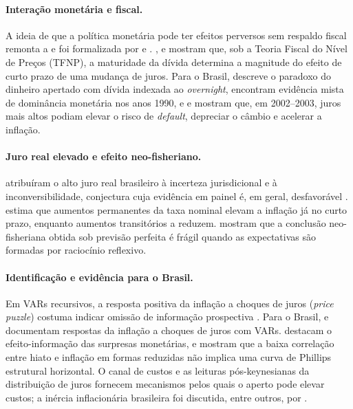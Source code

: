 \documentclass[12pt,a4paper]{article}
\begin{document}
\paragraph{Interação monetária e fiscal.} A ideia de que a política monetária pode ter efeitos perversos sem respaldo fiscal remonta a \citet{sargent1981some} e foi formalizada por \citet{leeper1991equilibria} e \citet{woodford2001fiscal}. \citet{cochrane2001long}, \citet{sims2011stepping} e \citet{cochrane2023fiscal} mostram que, sob a Teoria Fiscal do Nível de Preços (TFNP), a maturidade da dívida determina a magnitude do efeito de curto prazo de uma mudança de juros. Para o Brasil, \citet{loyo1999tight} descreve o paradoxo do dinheiro apertado com dívida indexada ao \textit{overnight}, \citet{tanner2003fiscal} encontram evidência mista de dominância monetária nos anos 1990, e \citet{blanchard2005fiscal} e \citet{favero2005inflation} mostram que, em 2002--2003, juros mais altos podiam elevar o risco de \textit{default}, depreciar o câmbio e acelerar a inflação.

\paragraph{Juro real elevado e efeito neo-fisheriano.} \citet{arida2005credit} atribuíram o alto juro real brasileiro à incerteza jurisdicional e à inconversibilidade, conjectura cuja evidência em painel é, em geral, desfavorável \citep{goncalves2007can}. \citet{uribe2022neo} estima que aumentos permanentes da taxa nominal elevam a inflação já no curto prazo, enquanto aumentos transitórios a reduzem. \citet{garciaschmidt2019low} mostram que a conclusão neo-fisheriana obtida sob previsão perfeita é frágil quando as expectativas são formadas por raciocínio reflexivo.

\paragraph{Identificação e evidência para o Brasil.} Em VARs recursivos, a resposta positiva da inflação a choques de juros (\textit{price puzzle}) costuma indicar omissão de informação prospectiva \citep{sims1992interpreting}. Para o Brasil, \citet{minella2003monetary} e \citet{cespedes2008monetary} documentam respostas da inflação a choques de juros com VARs. \citet{nakamura2018high} destacam o efeito-informação das surpresas monetárias, e \citet{mcleay2020optimal} mostram que a baixa correlação entre hiato e inflação em formas reduzidas não implica uma curva de Phillips estrutural horizontal. O canal de custos \citep{barth2001cost, ravenna2006financial} e as leituras pós-keynesianas da distribuição de juros \citep{lavoie1995interest, hein2007interest} fornecem mecanismos pelos quais o aperto pode elevar custos; a inércia inflacionária brasileira foi discutida, entre outros, por \citet{lopes1979causas}.
\end{document}
